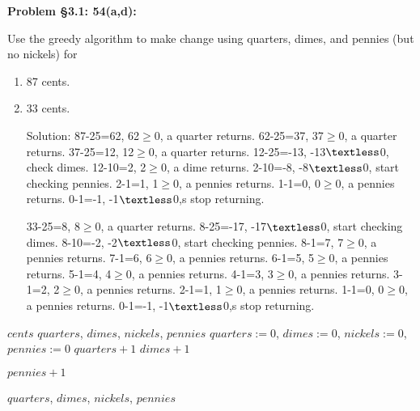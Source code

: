 \documentclass{article}
\newenvironment{problem}[1]
{\begin{mdframed}[default]
\textbf{Problem #1:}
}
{\end{mdframed}
}
\begin{document}
\begin{problem}{\S 3.1: 54(a,d)}
Use the greedy algorithm to make change using quarters, dimes, and pennies (but no
nickels) for
\begin{enumerate}
\item[(a)] 87 cents.
\item[(d)] 33 cents.

Solution:
87-25=62, 62$\geq$0, a quarter returns. 62-25=37, 37$\geq$0, a quarter returns. 37-25=12, 12$\geq$0, a quarter returns.
 12-25=-13, -13$\textless$0, check dimes.
12-10=2, 2$\geq$0, a dime returns. 2-10=-8, -8$\textless$0, start checking pennies. 
2-1=1, 1$\geq$0, a pennies returns. 1-1=0, 0$\geq$0, a pennies returns. 0-1=-1, -1$\textless$0,s stop returning.

33-25=8, 8$\geq$0, a quarter returns. 8-25=-17, -17$\textless$0, start checking dimes.
8-10=-2, -2$\textless$0, start checking pennies.
8-1=7, 7$\geq$0, a pennies returns. 7-1=6, 6$\geq$0, a pennies returns. 6-1=5, 5$\geq$0, a pennies returns. 5-1=4, 4$\geq$0, a pennies returns. 4-1=3, 3$\geq$0, a pennies returns. 3-1=2, 2$\geq$0, a pennies returns. 2-1=1, 1$\geq$0, a pennies returns. 1-1=0, 0$\geq$0, a pennies returns. 0-1=-1, -1$\textless$0,s stop returning.
\end{enumerate}
\end{problem}
\begin{algorithm}[]
    \caption{Algorithm of Problem \S 3.1:54}
    \label{alg:AOS}
    \renewcommand{\algorithmicrequire}{\textbf{Input:}}
    \renewcommand{\algorithmicensure}{\textbf{Output:}}
    
    \begin{algorithmic}[1]
        \REQUIRE $cents$ %
        \ENSURE $quarters$, $dimes$, $nickels$, $pennies$    %
        \STATE $quarters:=0$, $dimes:=0$, $nickels:=0$, $pennies:=0$
            \STATE $quarters+1$
        \ENDWHILE
            \STATE $dimes+1$
        \ENDWHILE
        
            \STATE $pennies+1$
        \ENDWHILE
    
        
        \RETURN $quarters$, $dimes$, $nickels$, $pennies$
    \end{algorithmic}
\end{algorithm}
\end{document}
